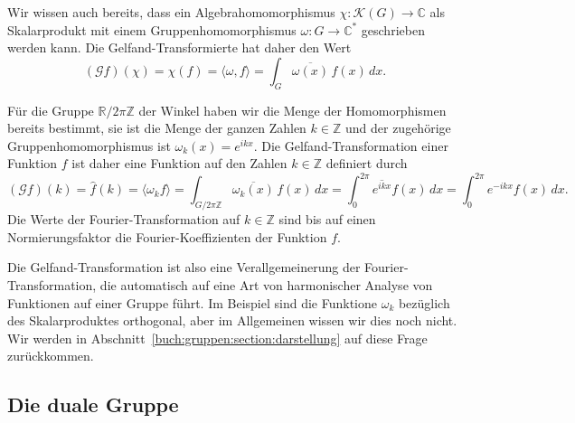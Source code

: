 Wir wissen auch bereits, dass ein Algebrahomomorphismus
$\chi\colon \mathscr{K}(G)\to\mathbb{C}$ als Skalarprodukt mit
einem Gruppenhomomorphismus 
$\omega\colon G\to\mathbb{C}^*$ geschrieben werden kann.
Die Gelfand-Transformierte hat daher den Wert
\[
(\mathscr{G}f)(\chi)
=
\chi(f)
=
\langle \omega ,f\rangle
=
\int_G \overline{\omega(x)}\,f(x)\,dx.
\]

\begin{beispiel}
Für die Gruppe $\mathbb{R}/2\pi\mathbb{Z}$ der Winkel haben wir die
Menge der Homomorphismen bereits bestimmt, sie ist die Menge der
ganzen Zahlen $k\in\mathbb{Z}$ und der zugehörige Gruppenhomomorphismus
ist $\omega_k(x) = e^{ikx}$.
Die Gelfand-Transformation einer Funktion $f$ ist daher eine Funktion
auf den Zahlen $k\in \mathbb{Z}$ definiert durch
\[
(\mathscr{G}f)(k)
=
\hat{f}(k)
=
\langle \omega_k f\rangle
=
\int_{G/2\pi \mathbb{Z}} \overline{\omega_k(x)}\, f(x) \,dx
=
\int_0^{2\pi} \overline{e^{ikx}} f(x)\,dx
=
\int_0^{2\pi} e^{-ikx} f(x)\,dx.
\]
Die Werte der Fourier-Transformation auf $k\in\mathbb{Z}$ sind bis auf einen
Normierungsfaktor die Fourier-Koeffizienten der Funktion $f$.
\end{beispiel}

Die Gelfand-Transformation ist also eine Verallgemeinerung der
Fourier-Transformation, die automatisch auf eine Art von harmonischer
Analyse von Funktionen auf einer Gruppe führt.
Im Beispiel sind die Funktione $\omega_k$ bezüglich des
Skalarproduktes orthogonal, aber im Allgemeinen wissen wir dies 
noch nicht.
Wir werden in Abschnitt~\ref{buch:gruppen:section:darstellung}
auf diese Frage zurückkommen.



%
%
\subsection{Die duale Gruppe
\label{buch:gruppen:gelfand:subsection:dual}}


